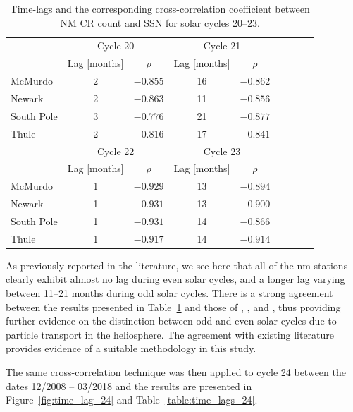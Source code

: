 \begin{table}[!ht]
	\begin{center}
	\caption{Time-lags and the corresponding cross-correlation coefficient between NM CR count and SSN for solar cycles 20--23.}
	\label{table:time_lags_20-23}
	\begin{tabular}{l c c c c c c c c}
		\hline 
		{} & \multicolumn{2}{c}{Cycle 20} & \multicolumn{2}{c}{Cycle 21}  \\
		{} & {Lag [months]} & {$\rho$} & {Lag [months]} & {$\rho$} \\ \hline
		{McMurdo} & {2} & {$-0.855$} & {16} & {$-0.862$}  \\
		{Newark} & {2} & {$-0.863$} & {11} & {$-0.856$} \\
		{South Pole} & {3} & {$-0.776$} & {21} & {$-0.877$}  \\
		{Thule} & {2} & {$-0.816$} & {17} & {$-0.841$} \\ \hline
		
		{} & \multicolumn{2}{c}{Cycle 22} & \multicolumn{2}{c}{Cycle 23}\\
		{} & {Lag [months]} & {$\rho$} & {Lag [months]} & {$\rho$}\\ \hline
		{McMurdo}  & {1} & {$-0.929$} & {13} & {$-0.894$} \\
		{Newark} & {1} & {$-0.931$} & {13} & {$-0.900$} \\
		{South Pole}  & {1} & {$-0.931$} & {14} & {$-0.866$} \\
		{Thule}  & {1} & {$-0.917$} & {14} & {$-0.914$}\\ \hline
	\end{tabular}
	\end{center}
\end{table}


As previously reported in the literature, we see here that all of the \gls{nm} stations clearly exhibit almost no lag during even solar cycles, and a longer lag varying between 11--21 months during odd solar cycles. There is a strong agreement between the results presented in Table~\ref{table:time_lags_20-23} and those of \cite{mavromichalaki_cosmic-ray_2007}, \cite{kane_lags_2014}, and \cite{paouris_solar_2015-1}, thus providing further evidence on the distinction between odd and even solar cycles due to particle transport in the heliosphere. The agreement with existing literature provides evidence of a suitable methodology in this study.

The same cross-correlation technique was then applied to cycle 24 between the dates 12/2008 -- 03/2018 and the results are presented in Figure~\ref{fig:time_lag_24} and Table~\ref{table:time_lags_24}.

